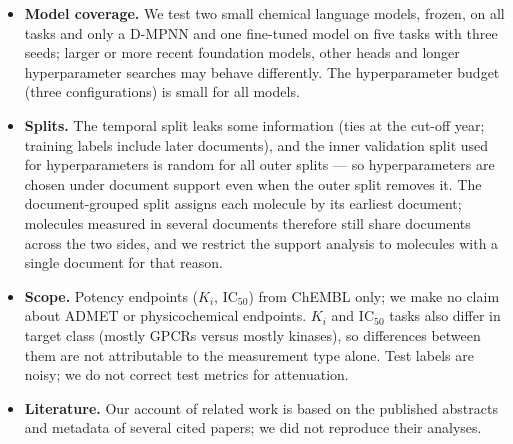 {\begin{itemize}
\item \textbf{Model coverage.} We test two small chemical language models, frozen, on all tasks and only a D-MPNN and one fine-tuned model on five tasks with three seeds; larger or more recent foundation models, other heads and longer hyperparameter searches may behave differently. The hyperparameter budget (three configurations) is small for all models.
\item \textbf{Splits.} The temporal split leaks some information (ties at the cut-off year; training labels include later documents), and the inner validation split used for hyperparameters is random for all outer splits --- so hyperparameters are chosen under document support even when the outer split removes it. The document-grouped split assigns each molecule by its earliest document; molecules measured in several documents therefore still share documents across the two sides, and we restrict the support analysis to molecules with a single document for that reason.
\item \textbf{Scope.} Potency endpoints ($K_i$, $\mathrm{IC}_{50}$) from ChEMBL only; we make no claim about ADMET or physicochemical endpoints. $K_i$ and $\mathrm{IC}_{50}$ tasks also differ in target class (mostly GPCRs versus mostly kinases), so differences between them are not attributable to the measurement type alone. Test labels are noisy; we do not correct test metrics for attenuation.
\item \textbf{Literature.} Our account of related work is based on the published abstracts and metadata of several cited papers; we did not reproduce their analyses.
\end{itemize}
\par}
